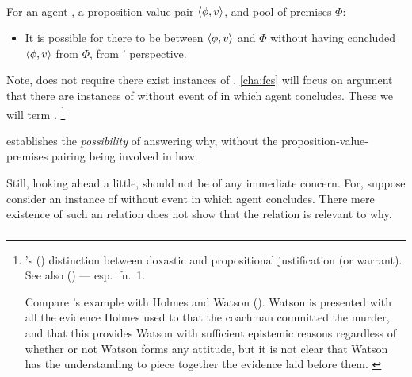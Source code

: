 \paragraph{\supportII{}}

\begin{note}
  \begin{idea}[\supportII{}]
    \label{idea:support:possible}
    For an agent \vAgent{}, a proposition-value pair \(\langle \phi, v \rangle\), and pool of premises \(\Phi\):

    \begin{itemize}
    \item
      It is possible for there to be \support{} between \(\langle \phi, v \rangle\) and \(\Phi\) without \vAgent{} having concluded \(\langle \phi, v \rangle\) from \(\Phi\), from \vAgent{}' perspective.
    \end{itemize}
    \vspace{-\baselineskip}
  \end{idea}

  Note, \supportII{} does not require there exist instances of \support{}.
  \autoref{cha:fcs} will focus on argument that there are instances of \support{} without event of in which agent concludes.
  These we will term .%
  \footnote{
    \citeauthor{Firth:1978vi}'s (\citeyear{Firth:1978vi}) distinction between doxastic and propositional justification (or warrant).
    See also \citeauthor{Silva:2020aa} (\citeyear{Silva:2020aa}) --- esp.\ fn.\ 1.

    {\color{red}
      Compare \citeauthor{Firth:1978vi}'s example with Holmes and Watson (\citeyear[218]{Firth:1978vi}).
      Watson is presented with all the evidence Holmes used to that the coachman committed the murder, and that this provides Watson with sufficient epistemic reasons regardless of whether or not Watson forms any attitude, but it is not clear that Watson has the understanding to piece together the evidence laid before them.
    }
  }

  \supportII{} establishes the \emph{possibility} of \support{} answering why, without the proposition-value-premises pairing being involved in how.

  Still, looking ahead a little, \supportII{} should not be of any immediate concern.
  For, suppose consider an instance of \support{} without event in which agent concludes.
  There mere existence of such an relation does not show that the relation is relevant to why.
\end{note}

\subsubsection{}
\label{sec:fc3}


